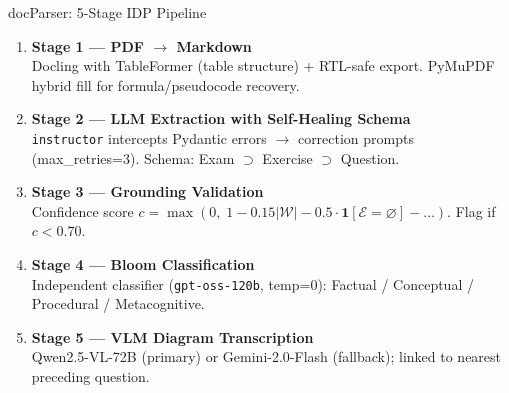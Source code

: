 \documentclass[aspectratio=169]{beamer}
\begin{document}
\begin{frame}{docParser: 5-Stage IDP Pipeline}
  \begin{enumerate}
    \item \textbf{Stage 1 — PDF $\to$ Markdown}\\
          Docling with TableFormer (table structure) + RTL-safe export.
          PyMuPDF hybrid fill for formula/pseudocode recovery.

    \vspace{4pt}
    \item \textbf{Stage 2 — LLM Extraction with Self-Healing Schema}\\
          \texttt{instructor} intercepts Pydantic errors $\to$ correction prompts
          (max\_retries=3). Schema: Exam $\supset$ Exercise $\supset$ Question.

    \vspace{4pt}
    \item \textbf{Stage 3 — Grounding Validation}\\
          Confidence score $c = \max(0,\;1 - 0.15|\mathcal{W}|
          - 0.5\cdot\mathbf{1}[\mathcal{E}{=}\varnothing] - \ldots)$.
          Flag if $c < 0.70$.

    \vspace{4pt}
    \item \textbf{Stage 4 — Bloom Classification}\\
          Independent classifier (\texttt{gpt-oss-120b}, temp=0):
          Factual / Conceptual / Procedural / Metacognitive.

    \vspace{4pt}
    \item \textbf{Stage 5 — VLM Diagram Transcription}\\
          Qwen2.5-VL-72B (primary) or Gemini-2.0-Flash (fallback);
          linked to nearest preceding question.
  \end{enumerate}
\end{frame}
\end{document}
